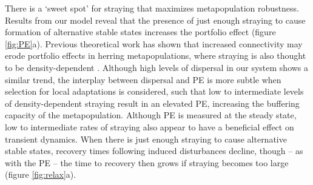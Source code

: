 \documentclass[twocolumn,preprintnumbers,amsmath,amssymb,superscriptaddress]{revtex4}
\begin{document}
% 

There is a `sweet spot' for straying that maximizes metapopulation robustness. 
Results from our model reveal that the presence of just enough straying to cause formation of alternative stable states increases the portfolio effect (figure \ref{fig:PE}a). 
Previous theoretical work has shown that increased connectivity may erode portfolio effects in herring metapopulations, where straying is also thought to be density-dependent \cite{Secor:2009ena}.
Although high levels of dispersal in our system shows a similar trend, the interplay between dispersal and PE is more subtle when selection for local adaptations is considered, such that low to intermediate levels of density-dependent straying result in an elevated PE, increasing the buffering capacity of the metapopulation.
Although PE is measured at the steady state, low to intermediate rates of straying also appear to have a beneficial effect on transient dynamics.
When there is just enough straying to cause alternative stable states, recovery times following induced disturbances decline, though -- as with the PE -- the time to recovery then grows if straying becomes too large (figure \ref{fig:relax}a).

\end{document}
